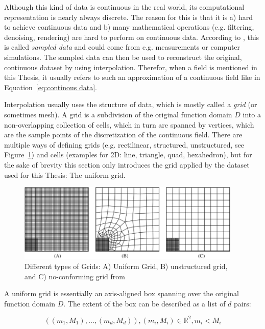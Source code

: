 Although this kind of data is continuous in the real world, its computational representation is nearly always discrete. 
The reason for this is that it is a) hard to achieve continuous data and b) many mathematical operations (e.g. filtering, denoising, rendering) are hard to perform on continuous data. 
According to , this is called \textit{sampled data} and could come from e.g. measurements or computer simulations. 
The sampled data can then be used to reconstruct the original, continuous dataset by using interpolation. 
Therefor, when a field is mentioned in this Thesis, it usually refers to such an approximation of a continuous field like in Equation~\ref{eq:continous data}. 


Interpolation usually uses the structure of data, which is mostly called a \textit{grid} (or sometimes mesh). 
A grid is a subdivision of the original function domain $D$ into a non\--overlapping collection of cells, which in turn are spanned by vertices, which are the sample points of the discretization of the continuous field.  
There are multiple ways of defining grids (e.g. rectilinear, structured, unstructured, see Figure~\ref{fig:grid types}) and cells (examples for 2D: line, triangle, quad, hexahedron), but for the sake of brevity this section only introduces the grid applied by the dataset used for this Thesis: The uniform grid. 

\begin{figure}
  \includegraphics[width=0.95\textwidth]{figures/grid-types.png}
  \caption{Different types of Grids: A) Uniform Grid, B) unstructured grid, and C) no-conforming grid from \cite{kaltenbacher_nonconforming_2022}}
  \label{fig:grid types}
\end{figure}


A uniform grid is essentially an axis-aligned box spanning over the original function domain $D$. 
The extent of the box can be described as a list of $d$ pairs:

\begin{equation}
  ((m_1, M_1),\dots,(m_d, M_d)), (m_i, M_i) \in \mathbb{R}^2, m_i < M_i
  \label{eq:uniform grid coordinates}
\end{equation}

